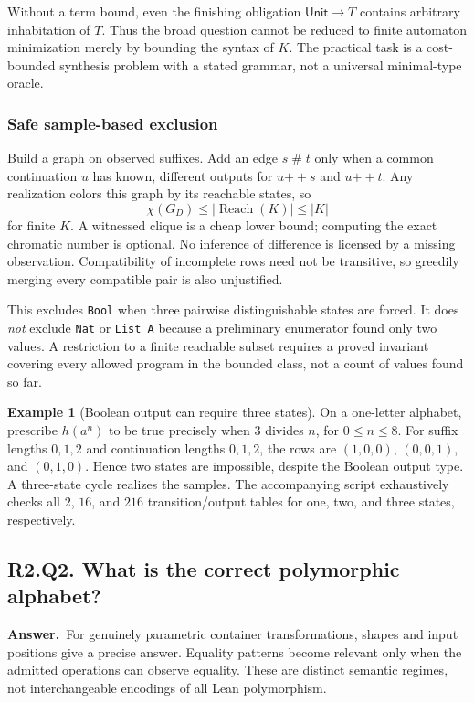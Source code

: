 \documentclass[11pt,a4paper]{article}
\theoremstyle{definition}
\newtheorem{example}[theorem]{Example}
\theoremstyle{remark}
\newcommand{\cat}{\mathbin{+\!+}}
\newcommand{\code}[1]{\texttt{#1}}
\newcommand{\answer}{\par\noindent\textbf{Answer.}\ }
\newcommand{\qheading}[2]{\subsection{#1. #2}}
\begin{document}
Without a term bound, even the finishing obligation $\mathsf{Unit}\to T$
contains arbitrary inhabitation of $T$. Thus the broad question cannot be
reduced to finite automaton minimization merely by bounding the syntax of $K$.
The practical task is a cost-bounded synthesis problem with a stated grammar,
not a universal minimal-type oracle.

\subsubsection*{Safe sample-based exclusion}
Build a graph on observed suffixes. Add an edge $s\mathrel{\#}t$ only when a
common continuation $u$ has known, different outputs for $u\cat s$ and
$u\cat t$. Any realization colors this graph by its reachable states, so
\[
 \chi(G_D)\le |\operatorname{Reach}(K)|\le |K|
 \tag{5}\label{eq:chromatic}
\]
for finite $K$. A witnessed clique is a cheap lower bound; computing the exact
chromatic number is optional. No inference of difference is licensed by a
missing observation. Compatibility of incomplete rows need not be transitive,
so greedily merging every compatible pair is also unjustified.

This excludes \code{Bool} when three pairwise distinguishable states are
forced. It does \emph{not} exclude \code{Nat} or \code{List A} because a
preliminary enumerator found only two values. A restriction to a finite reachable
subset requires a proved invariant covering every allowed program in the
bounded class, not a count of values found so far.

\begin{example}[Boolean output can require three states]
On a one-letter alphabet, prescribe $h(a^n)$ to be true precisely when $3$ divides
$n$, for $0\le n\le8$. For suffix lengths $0,1,2$ and continuation lengths
$0,1,2$, the rows are $(1,0,0)$, $(0,0,1)$, and $(0,1,0)$. Hence two states are
impossible, despite the Boolean output type. A three-state cycle realizes the
samples. The accompanying script exhaustively checks all $2$, $16$, and $216$
transition/output tables for one, two, and three states, respectively.
\end{example}

\qheading{R2.Q2}{What is the correct polymorphic alphabet?}
\answer For genuinely parametric container transformations, shapes and input
positions give a precise answer. Equality patterns become relevant only when
the admitted operations can observe equality. These are distinct semantic
regimes, not interchangeable encodings of all Lean polymorphism.
\end{document}

